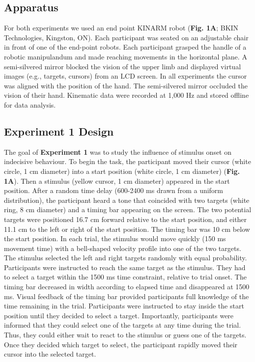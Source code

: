 \documentclass[man,donotrepeattitle,floatsintext,letterpaper,12pt]{apa7}
\newcommand\boldblue[1]{\textcolor{mydarkblue}{\textbf{#1}}}
\begin{document}
\subsection{Apparatus}

\noindent For both experiments we used an end point KINARM robot (\boldblue{Fig. 1A}; BKIN Technologies, Kingston, ON). Each participant was seated on an adjustable chair in front of one of the end-point robots. Each participant grasped the handle of a robotic manipulandum and made reaching movements in the horizontal plane. A semi-silvered mirror blocked the vision of the upper limb and displayed virtual images (e.g., targets, cursors) from an LCD screen. In all experiments the cursor was aligned with the position of the hand. The semi-silvered mirror occluded the vision of their hand. Kinematic data were recorded at 1,000 Hz and stored offline for data analysis.

\subsection{Experiment 1 Design}

\noindent The goal of \boldblue{Experiment 1} was to study the influence of stimulus onset on indecisive behaviour. To begin the task, the participant moved their cursor (white circle, 1 cm diameter) into a start position (white circle, 1 cm diameter) (\boldblue{Fig. 1A}). Then a stimulus (yellow cursor, 1 cm diameter) appeared in the start position. After a random time delay (600-2400 ms drawn from a uniform distribution), the participant heard a tone that coincided with two targets (white ring, 8 cm diameter) and a timing bar appearing on the screen. The two potential targets were positioned 16.7 cm forward relative to the start position, and either 11.1 cm to the left or right of the start position. The timing bar was 10 cm below the start position. In each trial, the stimulus would move quickly (150 ms movement time) with a bell-shaped velocity profile into one of the two targets. The stimulus selected the left and right targets randomly with equal probability. Participants were instructed to reach the same target as the stimulus. They had to select a target within the 1500 ms time constraint, relative to trial onset. The timing bar decreased in width according to elapsed time and disappeared at 1500 ms. Visual feedback of the timing bar provided participants full knowledge of the time remaining in the trial. Participants were instructed to stay inside the start position until they decided to select a target.  Importantly, participants were informed that they could select one of the targets at any time during the trial. Thus, they could either wait to react to the stimulus or guess one of the targets. Once they decided which target to select, the participant rapidly moved their cursor into the selected target.
\end{document}
